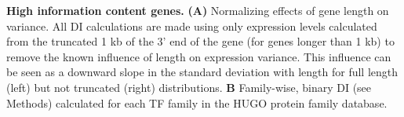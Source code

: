 \textbf{High information content genes.}
\textbf {(A)} Normalizing effects of gene length on variance. All DI calculations are made using only expression levels calculated from the truncated 1 kb of the 3' end of the gene (for genes longer than 1 kb) to remove the known influence of length on expression variance. This influence can be seen as a downward slope in the standard deviation with length for full length (left) but not truncated (right) distributions.
\textbf{B} Family-wise, binary DI (see Methods) calculated for each TF family in the HUGO protein family database. 